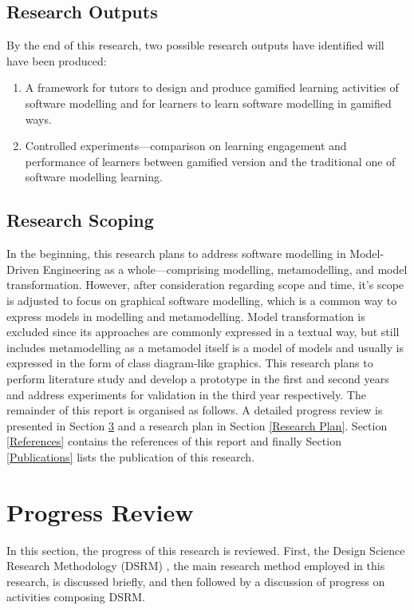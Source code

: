 \documentclass[12pt, a4paper]{report} \usepackage[titletoc]{appendix}
\begin{document}
\section{Research Outputs}
By the end of this research, two possible research outputs have identified will have been produced:
\begin{enumerate}
\item A framework for tutors to design and produce gamified learning activities of software modelling and for learners to learn software modelling in gamified ways. 
\item Controlled experiments---comparison on learning engagement and performance of learners between gamified version and the traditional one of software modelling learning.
\end{enumerate}

\section{Research Scoping}
In the beginning, this research plans to address software modelling in Model-Driven Engineering as a whole---comprising modelling, metamodelling, and model transformation. However, after consideration regarding scope and time, it's scope is adjusted to focus on graphical software modelling, which is a common way to express models in modelling and metamodelling. Model transformation is excluded since its approaches are commonly expressed in a textual way, but still includes metamodelling as a metamodel itself is a model of models and usually is expressed in the form of class diagram-like graphics. This research plans to perform literature study and develop a prototype in the first and second years and address experiments for validation in the third year respectively.\newline\newline
The remainder of this report is organised as follows. A detailed
progress review is presented in Section \ref{Progres Review} and a research plan in Section \ref{Research Plan}. Section \ref{References} contains the references of this report and finally Section \ref{Publications} lists the publication of this research.

\chapter{Progress Review}
\label{Progres Review}
In this section, the progress of this research is reviewed. First, the Design Science Research Methodology (DSRM) \cite{peffers2007design}, the main research method employed in this research, is discussed briefly, and then followed by a discussion of progress on activities composing DSRM.
\end{document}

